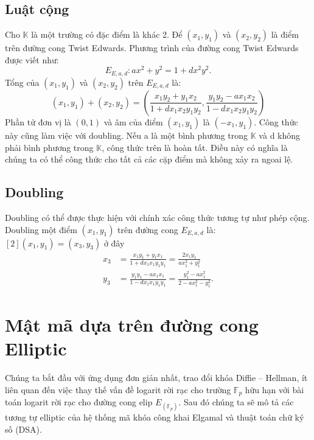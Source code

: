\documentclass[a4paper,12pt]{report}
\begin{document}
\subsection*{Luật cộng}
Cho $\displaystyle \mathbb{K}$ là một trường có đặc điểm là khác 2. Để $\displaystyle (x_{1}, y_{1})$ và $\displaystyle (x_{2}, y_{2})$ là điểm trên đường cong Twist Edwards. Phương trình của đường cong Twist Edwards được viết như:
\begin{displaymath}
E_{E,a,d}: ax^2 + y^2 = 1 + dx^2y^2.
\end{displaymath}
Tổng của $(x_1, y_1)$ và $(x_2, y_2)$ trên $E_{E,a,d}$ là:
\begin{displaymath}
(x_{1}, y_{1}) + (x_{2}, y_{2}) = \left({\frac {x_{1}y_{2} + y_{1}x_{2}} { 1 + dx_{1}x_{2}y_{1}y_{2}}}, {\frac{y_{1}y_{2} - ax_{1}x_{2}} {1 - dx_{1}x_{2}y_{1}y_{2}}} \right)
\end{displaymath}
Phần tử đơn vị là $(0,1)$ và âm của điểm $(x_1, y_1)$ là $(-x_1, y_1)$. Công thức này cũng làm việc với doubling. Nếu a là một bình phương trong $\mathbb{K}$ và d không phải bình phương trong $\mathbb{K}$, công thức trên là hoàn tất. Điều này có nghĩa là chúng ta có thể công thức cho tất cả các cặp điểm mà không xảy ra ngoai lệ.
\subsection*{Doubling}
Doubling có thể được thực hiện với chính xác công thức tương tự như phép cộng. Doubling một điểm $(x_1 , y_1)$ trên đường cong $E_{E,a,d}$ là: $[2](x_1, y_1) = (x_3, y_3)$ ở đây
\begin{displaymath}
\begin{aligned}
x_{3} &= {\frac{x_{1}y_{1}+y_{1}x_{1}}{1+dx_{1}x_{1}y_{1}y_{1}}}={\frac {2x_{1}y_{1}}{ax_{1}^{2}+y_{1}^{2}}} \\[6pt]
y_{3} &= {\frac {y_{1}y_{1} - ax_{1}x_{1}}{1 - dx_{1}x_{1}y_{1}y_{1}}}={\frac{y_{1}^{2} - ax_{1}^{2}}{2 - ax_{1}^{2} - y_{1}^{2}}}.
\end{aligned}
\end{displaymath}
\section{Mật mã dựa trên đường cong Elliptic}
Chúng ta bắt đầu với ứng dụng đơn giản nhất, trao đổi khóa Diffie – Hellman, ít liên quan đến việc thay thế vấn đề logarit rời rạc cho trường $\mathbb{F}_p$ hữu hạn với bài toán logarit rời rạc cho đường cong elip $E_(\mathbb{F}_p)$. Sau đó chúng ta sẽ mô tả các tương tự elliptic của hệ thống mã khóa công khai Elgamal và thuật toán chữ ký số (DSA).
\end{document}
